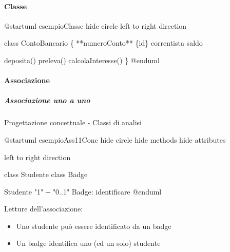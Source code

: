 \documentclass[
]{article}
\newenvironment{Shaded}{}{}
\newcommand{\NormalTok}[1]{#1}
\providecommand{\tightlist}{%
  \setlength{\itemsep}{0pt}\setlength{\parskip}{0pt}}
\begin{document}
\paragraph{Classe}\label{classe}

\begin{Shaded}
\begin{Highlighting}[]
\NormalTok{@startuml esempioClasse}
\NormalTok{hide circle}
\NormalTok{left to right direction}

\NormalTok{class ContoBancario \{}
\NormalTok{  **numeroConto** \{id\}}
\NormalTok{  correntista}
\NormalTok{  saldo}
  
\NormalTok{  deposita()}
\NormalTok{  preleva()}
\NormalTok{  calcolaInteresse()}
\NormalTok{\}}
\NormalTok{@enduml}
\end{Highlighting}
\end{Shaded}



\paragraph{Associazione}\label{associazione}

\subparagraph{Associazione uno a uno}\label{associazione-uno-a-uno}

Progettazione concettuale - Classi di analisi

\begin{Shaded}
\begin{Highlighting}[]
\NormalTok{@startuml esempioAss11Conc}
\NormalTok{hide circle}
\NormalTok{hide methods}
\NormalTok{hide attributes}

\NormalTok{left to right direction}

\NormalTok{class Studente}
\NormalTok{class Badge}

\NormalTok{Studente "1" {-}{-} "0..1" Badge: identificare}
\NormalTok{@enduml}
\end{Highlighting}
\end{Shaded}



Letture dell'associazione:

\begin{itemize}
\tightlist
\item
  Uno studente può essere identificato da un badge
\item
  Un badge identifica uno (ed un solo) studente
\end{itemize}
\end{document}
